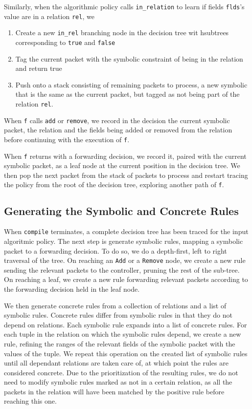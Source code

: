 \documentclass[preprint]{sigplanconf}
\begin{document}
Similarly, when the algorithmic policy calls \lstinline|in_relation| to learn if fields \lstinline|flds|'s value are in a relation \lstinline|rel|, we
\begin{enumerate}
  \item Create a new \lstinline|in_rel| branching node in the decision tree wit hsubtrees corresponding to \lstinline|true| and \lstinline|false|
  \item Tag the current packet with the symbolic constraint of being in the relation and return true
  \item Push onto a stack consisting of remaining packets to process, a new symbolic that is the same as the current packet, but tagged as not being part of the relation \lstinline|rel|.
\end{enumerate}
When \lstinline|f| calls \lstinline|add| or \lstinline|remove|, we record in the decision the current symbolic packet, the relation and the fields being added or removed from the relation before continuing with the execution of \lstinline|f|.





When \lstinline|f| returns with a forwarding decision, we record it, paired with the current symbolic packet, as a leaf node at the current position in the decision tree. We then pop the next packet from the stack of packets to process and restart tracing the policy from the root of the decision tree, exploring another path of \lstinline|f|.  

\subsection*{Generating the Symbolic and Concrete Rules}

When \lstinline|compile| terminates, a complete decision tree has been traced for the input algoritmic policy. The next step is generate symbolic rules, mapping a symbolic packet to a forwarding decision.
To do so, we do a depth-first, left to right traversal of the tree. On reaching an \lstinline|Add| or a \lstinline|Remove| node, we create a new rule sending the relevant packets to the controller, pruning the rest of the sub-tree. On reaching a leaf, we create a new rule forwarding relevant packets according to the forwarding decision held in the leaf node.

We then generate concrete rules from a collection of relations and a list of symbolic rules. Concrete rules differ from symbolic rules in that they do not depend on relations. Each symbolic rule expands into a list of concrete rules. For each tuple in the relation on which the symbolic rules depend, we create a new rule, refining the ranges of the relevant fields of the symbolic packet with the values of the tuple. We repeat this operation on the created list of symbolic rules until all dependant relations are taken care of, at which point the rules are considered concrete. Due to the prioritization of the resulting rules, we do not need to modify symbolic rules marked as not in a certain relation, as all the packets in the relation will have been matched by the positive rule before reaching this one.
\end{document}
